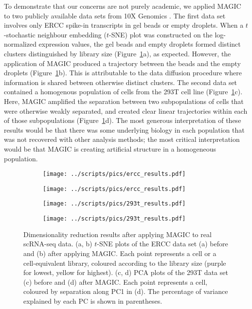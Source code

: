 \documentclass[10pt,letterpaper]{article}
\begin{document}
To demonstrate that our concerns are not purely academic, we applied MAGIC to two publicly available data sets from 10X Genomics \cite{zheng2017massively}.
The first data set involves only ERCC spike-in transcripts in gel beads or empty droplets.
When a $t$-stochastic neighbour embedding ($t$-SNE) \cite{van2008visualizing} plot was constructed on the log-normalized expression values, the gel beads and empty droplets formed distinct clusters distinguished by library size (Figure~\ref{fig:realdata}a), as expected.
However, the application of MAGIC produced a trajectory between the beads and the empty droplets (Figure~\ref{fig:realdata}b).
This is attributable to the data diffusion procedure where information is shared between otherwise distinct clusters.
The second data set contained a homogenous population of cells from the 293T cell line (Figure~\ref{fig:realdata}c).
Here, MAGIC amplified the separation between two subpopulations of cells that were otherwise weakly separated,
and created clear linear trajectories within each of those subpopulations (Figure~\ref{fig:realdata}d).
The most generous interpretation of these results would be that there was some underlying biology in each population that was not recovered with other analysis methods;
the most critical interpretation would be that MAGIC is creating artificial structure in a homogeneous population.

\begin{figure}[btp]
\centering
\begin{subfigure}[b]{0.49\textwidth}
    \texttt{[image: ../scripts/pics/ercc\_results.pdf]}
    \caption{}
\end{subfigure}
\begin{subfigure}[b]{0.49\textwidth}
    \texttt{[image: ../scripts/pics/ercc\_results.pdf]}
    \caption{}
\end{subfigure}
\begin{subfigure}[b]{0.49\textwidth}
    \texttt{[image: ../scripts/pics/293t\_results.pdf]}
    \caption{}
\end{subfigure}
\begin{subfigure}[b]{0.49\textwidth}
    \texttt{[image: ../scripts/pics/293t\_results.pdf]}
    \caption{}
\end{subfigure}
\caption{Dimensionality reduction results after applying MAGIC to real scRNA-seq data.
(a, b) $t$-SNE plots of the ERCC data set (a) before and (b) after applying MAGIC.
Each point represents a cell or a cell-equivalent library, coloured according to the library size (purple for lowest, yellow for highest).
(c, d) PCA plots of the 293T data set (c) before and (d) after MAGIC.
Each point represents a cell, coloured by separation along PC1 in (d).
The percentage of variance explained by each PC is shown in parentheses.}
\label{fig:realdata}
\end{figure}
\end{document}
